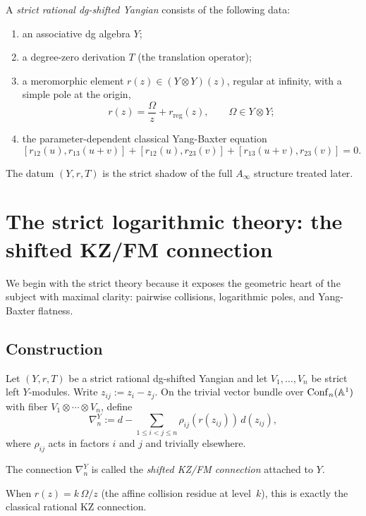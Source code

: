 \begin{definition}%
A \emph{strict rational dg-shifted Yangian} consists of the following data:
\begin{enumerate}[label=\textup{(\alph*)}]
 \item an associative dg algebra $Y$;
 \item a degree-zero derivation $T$ (the translation operator);
 \item a meromorphic element $r(z)\in (Y\otimes Y)(z)$, regular at infinity, with a simple pole at the origin,
 \[
 r(z)=\frac{\Omega}{z}+r_{\mathrm{reg}}(z),\qquad \Omega\in Y\otimes Y;
 \]
 \item the parameter-dependent classical Yang-Baxter equation
 \[
 [r_{12}(u),r_{13}(u+v)] + [r_{12}(u),r_{23}(v)] + [r_{13}(u+v),r_{23}(v)] = 0.
 \]
\end{enumerate}
\end{definition}

The datum $(Y,r,T)$ is the strict shadow of the full $A_\infty$ structure treated later.

\section{The strict logarithmic theory: the shifted KZ/FM connection}%

We begin with the strict theory because it exposes the geometric heart of the subject with maximal clarity: pairwise collisions, logarithmic poles, and Yang-Baxter flatness.

\subsection{Construction}
Let $(Y,r,T)$ be a strict rational dg-shifted Yangian and let $V_1,\dots,V_n$ be strict left $Y$-modules. Write $z_{ij}:=z_i-z_j$. On the trivial vector bundle over $\mathrm{Conf}_n(\mathbb A^1)$ with fiber $V_1\otimes\cdots\otimes V_n$, define
\[
 \nabla_n^Y
 :=
 d-\sum_{1\le i<j\le n}\rho_{ij}(r(z_{ij}))\,d(z_{ij}),
\]
where $\rho_{ij}$ acts in factors $i$ and $j$ and trivially elsewhere.

\begin{definition}
The connection $\nabla_n^Y$ is called the \emph{shifted KZ/FM connection} attached to $Y$.
\end{definition}

When $r(z)=k\,\Omega/z$ (the affine collision residue at level~$k$), this is exactly the classical rational KZ connection.

